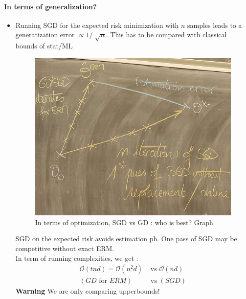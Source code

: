 \begin{note}[]
    \paragraph*{In terms of generalization?}
    \begin{itemize}
        \item Running SGD for the expected risk minimization with $ n $ samples leads to a generatization error $ \propto 1/\sqrt[]{n} $. This has to be compared with classical bounds of stat/ML
        \begin{figure}[!h]
            \centering
            \includegraphics[width=.8\textwidth]{figs/SGD_vs_GD_generalization.jpg}
            \caption{In terms of optimization, SGD vs GD : who is best? Graph }
        \end{figure}
        SGD on the expected risk avoids estimation pb. One pass of SGD may be competitive without exact ERM. \\
        In term of running complexities, we get :
        \begin{align*}
            \mathcal{O} (tnd) = \mathcal{O}(n^2 d) &\text{ vs } \mathcal{O}(nd) \\
            (GD \text{ for } ERM) &\text{ vs } (SGD)
        \end{align*}
        \textbf{Warning} We are only comparing upperbounds!
        
    \end{itemize}
\end{note}





